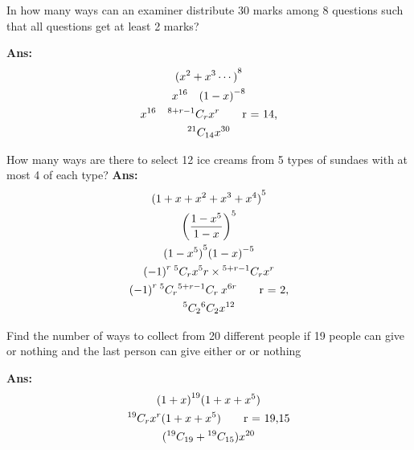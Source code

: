 \begin{example}
    In how many ways can an examiner distribute 30 marks among 8 questions such that all questions get at least 2 marks?

    \textbf{Ans:}
    \begin{gather*}
        {(x^2 + x^3 \cdots)}^8 \\
        x^{16}\quad {(1 - x)}^{-8}\\
        x^{16}\quad{}^{8 + r - 1}C_{r} x^r  \tag*{r = 14,} \\
        {}^{21}C_{14} x^{30}
    \end{gather*}
\end{example}
\begin{example}
    How many ways are there to select 12 ice creams from 5 types of sundaes with at most 4 of each type?
    \textbf{Ans:}
    \begin{gather*}
        {(1 + x + x^2 + x^3 + x^4 )}^5 \\
        {\left(\frac{1 - x^5}{1 - x}\right)}^5 \\
        {(1 - x^5)}^5 {(1 - x)}^{-5}\\
        {( - 1)}^r\: {}^{5}C_{r} x^5r \times {}^{5 + r - 1}C_{r} x^r \\
        {( - 1)}^r\: {}^{5}C_{r} {}^{5 + r - 1}C_{r}\: x^{6r} \tag*{r = 2,} \\
        {}^{5}C_{2} {}^{6}C_{2} x^{12}
    \end{gather*}
\end{example}

\begin{example}
    Find the number of ways to collect  from 20 different people if 19 people can give  or nothing and the last person can give either  or  or nothing
    
    \textbf{Ans:}\begin{gather*}
        {(1 + x)}^{19} {(1 + x + x^5)}\\
        {}^{19}C_{r} x^r {(1 + x + x^5)} \tag*{r = 19,15}\\
        {({}^{19}C_{19} + {}^{19}C_{15})} x^{20}
    \end{gather*}
\end{example}
